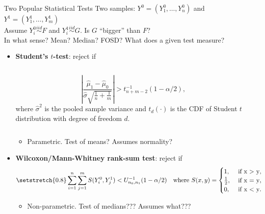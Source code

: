 \begin{frame}{Two Popular Statistical Tests}
Two samples: $Y^0=(Y_1^0,\ldots,Y_n^0)$ and $Y^1=(Y_1^1,\ldots,Y_m^1)$\\
Assume $Y_i^0 \overset{iid}{\sim} F$ and $Y_i^1\overset{iid}{\sim}G$. Is $G$ ``bigger'' than $F$?\\
In what sense? Mean? Median? FOSD? What does a given test measure?
\begin{itemize}
    \item \textbf{Student's $t$-test}: reject if
        	\vspace{1em}
        	\begin{columns}[]
        		\vspace{-1em}
        		\begin{equation*}
        			\left| \frac{\hat\mu_1-\hat\mu_0}{\hat\sigma\sqrt{\frac{1}{n}+\frac{1}{m}}}
        			\right| > t^{-1}_{n+m-2}(1-\alpha/2),
        		\end{equation*}
        		\scriptsize
        	 where $\hat\sigma^2$ is the pooled sample variance and $t_d(\cdot)$ is the CDF of Student $t$ distribution with degree of freedom $d$.
        	\end{columns}
         \begin{itemize}
             \item Parametric. Test of means? Assumes normality?
         \end{itemize}
    \item \textbf{Wilcoxon/Mann-Whitney rank-sum test}: reject if \vspace{-1em}
\begin{equation*}\vspace{-0.5em}\setstretch{0.8}
		\sum_{i=1}^n \sum_{j=1}^m S(Y^0_i, Y^1_j) < U_{n_0,n_1}^{-1}(1-\alpha/2)
		\text{\quad where }
		S(x, y)=
		\begin{cases}
			1, & \text{ if } $x > y$,\\
			\frac{1}{2}, & \text{ if } $x = y$,\\
			0, & \text{ if } $x < y$.
		\end{cases}
\end{equation*}
    \begin{itemize}
        \item Non-parametric. Test of medians??? Assumes what???
    \end{itemize}
\end{itemize}
\end{frame}

